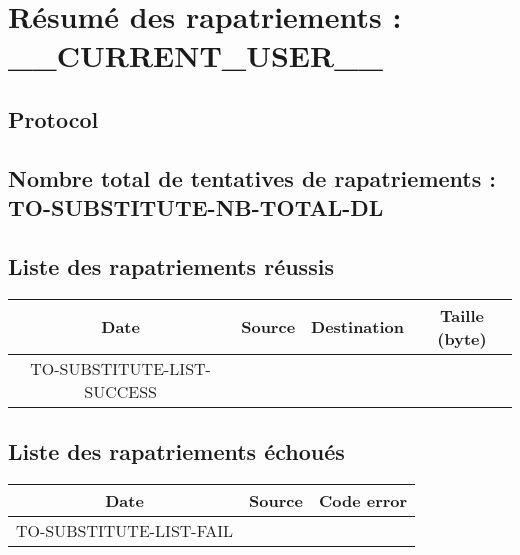 \newpage


\section{Résumé des rapatriements : __CURRENT_USER__}
  \subsection{Protocol}

  \subsection{Nombre total de tentatives de rapatriements : TO-SUBSTITUTE-NB-TOTAL-DL}
    
  \subsection{Liste des rapatriements réussis}
    \scalebox{0.7}
    {
      \begin{tabular}{|c|c|c|c|}
        \hline
        Date & Source & Destination & Taille (byte) \\
        \hline
        TO-SUBSTITUTE-LIST-SUCCESS
        \hline
      \end{tabular}
    }

  \subsection{Liste des rapatriements échoués}
    \scalebox{0.7}
    {
      \begin{tabular}{|c|c|c|}
        \hline
        Date & Source & Code error  \\
        \hline
        TO-SUBSTITUTE-LIST-FAIL
        \hline
      \end{tabular}
    }
